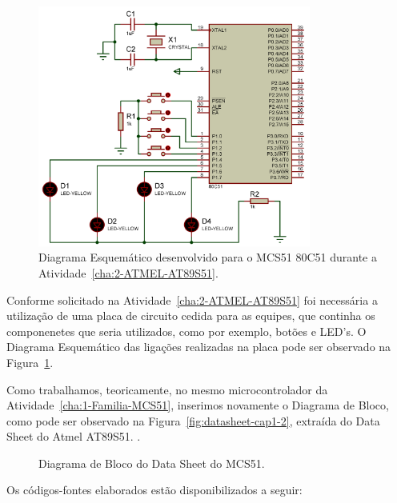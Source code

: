 \documentclass[
	12pt,				%
	openright,			%
  oneside,     %
	a4paper,			%
	english,			%
	french,				%
	spanish,			%
	brazil				%
	]{abntex2}
\begin{document}
\begin{figure}[ht]
  \centering
  \caption{\label{fig:Atividade-02-05-Schematic-01}Diagrama Esquemático desenvolvido para o MCS51 80C51 durante a Atividade~\ref{cha:2-ATMEL-AT89S51}.}
  \includegraphics[width=0.8\textwidth]{images/Atividade02/Atividade-02-05-Schematic-01.png}  
\end{figure}

Conforme solicitado na Atividade~\ref{cha:2-ATMEL-AT89S51} foi necessária a utilização de uma placa de circuito cedida para as equipes, que continha os componenetes que seria utilizados, como por exemplo, botões e LED's. O Diagrama Esquemático das ligações realizadas na placa pode ser observado na Figura~\ref{fig:Atividade-02-05-Schematic-01}.

Como trabalhamos, teoricamente, no mesmo microcontrolador da Atividade~\ref{cha:1-Familia-MCS51}, inserimos novamente o Diagrama de Bloco, como pode ser observado na Figura~\ref{fig:datasheet-cap1-2}, extraída do Data Sheet do Atmel AT89S51. \cite{Corporation2000}.

\newpage

  \begin{figure}[H]
    \centering
    
    \caption{\label{fig:datasheet-cap1-2-2}Diagrama de Bloco do Data Sheet do MCS51.}
  \end{figure}

\newpage

Os códigos-fontes elaborados estão disponibilizados a seguir:
\end{document}
